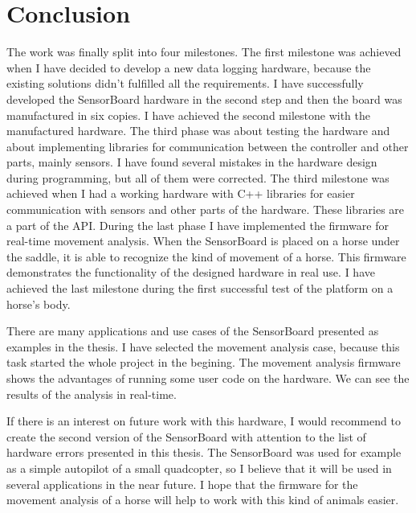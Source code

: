 \chapter{Conclusion}
The work was finally split into four milestones. The first milestone was achieved when I have decided to develop a new data logging hardware, because the existing solutions didn't fulfilled all the requirements. I have successfully developed the SensorBoard hardware in the second step and then the board was manufactured in six copies. I have achieved the second milestone with the manufactured hardware. The third phase was about testing the hardware and about implementing libraries for communication between the controller and other parts, mainly sensors. I have found several mistakes in the hardware design during programming, but all of them were corrected. The third milestone was achieved when I had a working hardware with C++ libraries for easier communication with sensors and other parts of the hardware. These libraries are a part of the API. During the last phase I have implemented the firmware for real-time movement analysis. When the SensorBoard is placed on a horse under the saddle, it is able to recognize the kind of movement of a horse. This firmware demonstrates the functionality of the designed hardware in real use. I have achieved the last milestone during the first successful test of the platform on a horse's body.

There are many applications and use cases of the SensorBoard presented as examples in the thesis. I have selected the movement analysis case, because this task started the whole project in the begining. The movement analysis firmware shows the advantages of running some user code on the hardware. We can see the results of the analysis in real-time.

If there is an interest on future work with this hardware, I would recommend to create the second version of the SensorBoard with attention to the list of hardware errors presented in this thesis. The SensorBoard was used for example as a simple autopilot of a small quadcopter, so I believe that it will be used in several applications in the near future. I hope that the firmware for the movement analysis of a horse will help to work with this kind of animals easier.